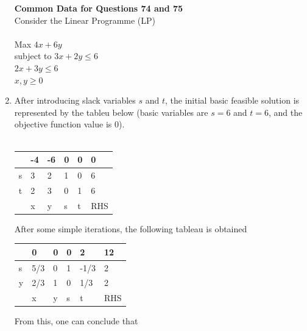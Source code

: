 \documentclass[journal,12pt,onecolumn]{IEEEtran}
\begin{document}
\begin{enumerate}
          \normalsize\textbf{Common Data for Questions 74 and 75}\\
          Consider the Linear Programme (LP)\\\\
          Max $4x + 6y$\\
          subject to
          $3x+2y\le6$\\
          $2x+3y\le6$\\
          $x,y\ge0$

    \item After introducing slack variables $s$ and $t$, the initial basic feasible solution is represented by the tableu below (basic variables are $s=6$ and $t=6$, and the objective function value is 0).\\\\
          \begin{table}[H]
              \centering\large
              \begin{tabular}{|l|l|l|l|l|l|}
                  \hline
                    & -4 & -6 & 0 & 0 & 0   \\\hline
                  s & 3  & 2  & 1 & 0 & 6   \\\hline
                  t & 2  & 3  & 0 & 1 & 6   \\\hline
                    & x  & y  & s & t & RHS \\\hline
              \end{tabular}
              \label{t74}
          \end{table}
          After some simple iterations, the following tableau is obtained
          \begin{table}[H]
              \centering\large
              \begin{tabular}{|l|l|l|l|l|l|}
                  \hline
                    & 0   & 0 & 0 & 2    & 12  \\\hline
                  s & 5/3 & 0 & 1 & -1/3 & 2   \\\hline
                  y & 2/3 & 1 & 0 & 1/3  & 2   \\\hline
                    & x   & y & s & t    & RHS \\\hline
              \end{tabular}
              \label{}
          \end{table}
          From this, one can conclude that

          \begin{enumerate}
          \end{enumerate}


\end{enumerate}
\end{document}
